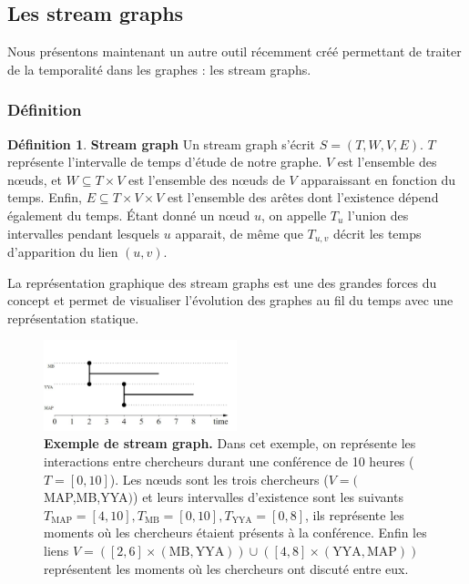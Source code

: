 \documentclass[11pt,a4paper]{article}
\theoremstyle{definition}
\newtheorem{defn}{Définition}
\theoremstyle{remark}
\theoremstyle{remark}
\def \stg {stream graph}
\def \Stg {Stream graph}
\def \stgs {stream graphs}
\begin{document}
\subsection{Les \stgs }

Nous présentons maintenant un autre outil récemment créé permettant de traiter de la temporalité dans les graphes : les \stgs .
\subsubsection{Définition}

\begin{defn}{\textbf{\Stg}}
Un \stg{} s'écrit $S=(T,W,V,E)$. $T$ représente l'intervalle de temps d'étude de notre graphe. $V$ est l'ensemble des nœuds, et $W \subseteq T \times V$ est l'ensemble des nœuds de $V$ apparaissant en fonction du temps. Enfin, $E \subseteq T \times V \times V$ est l'ensemble des arêtes dont l'existence dépend également du temps. Étant donné un nœud $u$, on appelle $T_u$ l'union des intervalles pendant lesquels $u$ apparait, de même que $T_{u,v}$ décrit les temps d'apparition du lien $(u,v)$.
\end{defn}

La représentation graphique des \stgs{} est une des grandes forces du concept et permet de visualiser l'évolution des graphes au fil du temps avec une représentation statique.

\begin{figure}[H]
\centering
\includegraphics[width=0.5\textwidth]{exStreamGraph.JPG}
\caption{\textbf{Exemple de stream graph.} Dans cet exemple, on représente les interactions entre chercheurs durant une conférence de 10 heures ($T=[0,10]$). Les nœuds sont les trois chercheurs ($V=($MAP,MB,YYA$)$) et leurs intervalles d'existence sont les suivants $T_{\text{MAP}}=[4,10], T_{\text{MB}}=[0,10], T_{\text{YYA}}=[0,8]$, ils représente les moments où les chercheurs étaient présents à la conférence. Enfin les liens $V=([2,6]\times (\text{MB},\text{YYA})) \cup ([4,8]\times(\text{YYA},\text{MAP}))$ représentent les moments où les chercheurs ont discuté entre eux.}
\end{figure}
\end{document}
